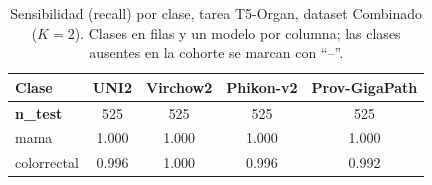 \begin{table}[H]
\centering
\caption{Utilidad global por modelo, tarea T5-Organ. IC 95\% obtenido por bootstrap (1000 remuestreos, a nivel de paciente).}
\label{tab:anexo_organ_utilidad}
\end{table}

\begin{table}[H]
\centering
\caption{Sensibilidad (recall) por clase, tarea T5-Organ, dataset Combinado ($K=2$). Clases en filas y un modelo por columna; las clases ausentes en la cohorte se marcan con ``--''.}
\label{tab:anexo_organ_sensibilidad}
\begin{tabular}{l c c c c}
\toprule
\textbf{Clase} & \textbf{UNI2} & \textbf{Virchow2} & \textbf{Phikon-v2} & \textbf{Prov-GigaPath} \\
\midrule
\textbf{n\_test} & 525 & 525 & 525 & 525 \\
mama & 1.000 & 1.000 & 1.000 & 1.000 \\
colorrectal & 0.996 & 1.000 & 0.996 & 0.992 \\
\bottomrule
\end{tabular}
\end{table}

